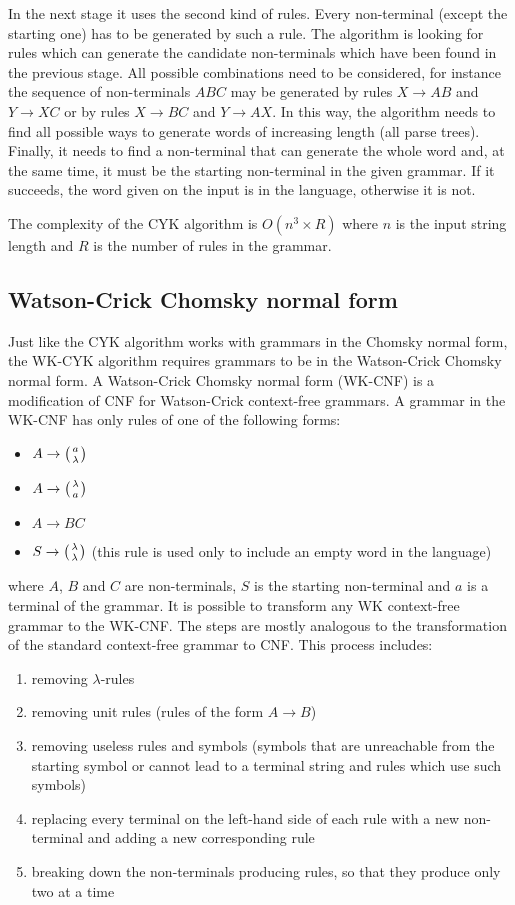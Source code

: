 In the next stage it uses the second kind of rules. Every non-terminal (except the starting one) has to be generated by such a rule.
The algorithm is looking for rules which can generate the candidate non-terminals which have been found in the previous stage. All possible combinations need to be considered, for instance the sequence of non-terminals $ABC$ may be generated by rules $X \rightarrow AB$ and $Y \rightarrow XC$ or by rules $X \rightarrow BC$ and $Y \rightarrow AX$. In this way, the algorithm needs to find all possible ways to generate words of increasing length (all parse trees). Finally, it needs to find a non-terminal that can generate the whole word and, at the same time, it must be the starting non-terminal in the given grammar. If it succeeds, the word given on the input is in the language, otherwise it is not.

The complexity of the CYK algorithm is $O(n^3 \times R)$ where $n$ is the input string length and $R$ is the number of rules in the grammar.

\subsection{Watson-Crick Chomsky normal form}
Just like the CYK algorithm works with grammars in the Chomsky normal form, the WK-CYK algorithm requires grammars to be in the Watson-Crick Chomsky normal form. A Watson-Crick Chomsky normal form (WK-CNF) is a modification of CNF for Watson-Crick context-free grammars. A grammar in the WK-CNF has only rules of one of the following forms:

\begin{itemize}
  \item{$A \rightarrow \wkpair{a}{\lambda}$}
  \item{$A \rightarrow \wkpair{\lambda}{a}$}
  \item{$A \rightarrow B C$}
  \item{$S \rightarrow \wkpair{\lambda}{\lambda}$ (this rule is used only to include an empty word in the language)}
\end{itemize}

where $A$, $B$ and $C$ are non-terminals, $S$ is the starting non-terminal and $a$ is a terminal of the grammar. It is possible to transform any WK context-free grammar to the WK-CNF. The steps are mostly analogous to the transformation of the standard context-free grammar to CNF. This process includes:

\begin{enumerate}
  \item{removing $\lambda$-rules}
  \item{removing unit rules (rules of the form $A \rightarrow B$)}
  \item{removing useless rules and symbols (symbols that are unreachable from the starting symbol or cannot lead to a terminal string and rules which use such symbols)}
  \item{replacing every terminal on the left-hand side of each rule with a new non-terminal and adding a new corresponding rule}
  \item{breaking down the non-terminals producing rules, so that they produce only two at a time}
\end{enumerate}

